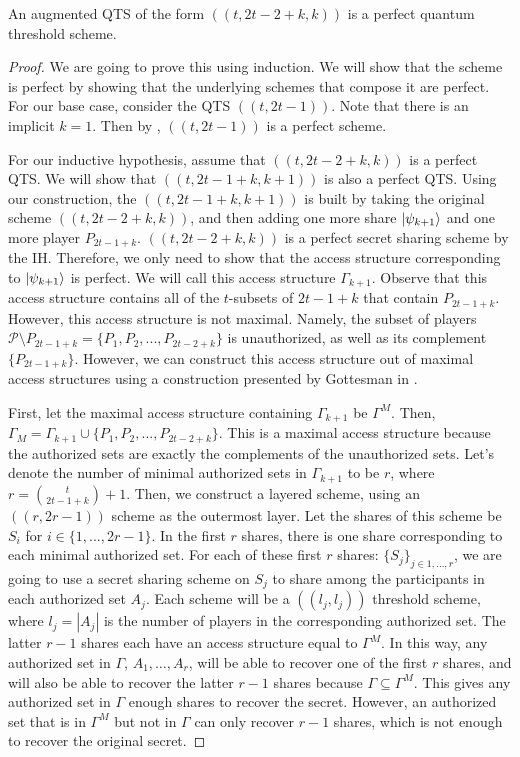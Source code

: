 \begin{theorem}
    An augmented QTS of the form $((t,2t-2+k,k))$ is a perfect quantum threshold scheme.
\end{theorem}

\begin{proof}
    We are going to prove this using induction. We will show that the scheme is perfect by showing that the underlying schemes that compose it are perfect. For our base case, consider the QTS $((t,2t-1))$. Note that there is an implicit $k=1$. Then by , $((t,2t-1))$ is a perfect scheme.
    
    For our inductive hypothesis, assume that $((t,2t-2+k,k))$ is a perfect QTS. We will show that $((t,2t-1+k,k+1))$ is also a perfect QTS. Using our construction, the $((t,2t-1+k,k+1))$ is built by taking the original scheme $((t,2t-2+k,k))$, and then adding one more share $\ket{\psi_{k+1}}$ and one more player $P_{2t-1+k}$. $((t,2t-2+k,k))$ is a perfect secret sharing scheme by the IH. Therefore, we only need to show that the access structure corresponding to $\ket{\psi_{k+1}}$ is perfect. We will call this access structure $\Gamma_{k+1}$. Observe that this access structure contains all of the $t$-subsets of $2t-1+k$ that contain $P_{2t-1+k}$. However, this access structure is not maximal. Namely, the subset of players $\mathcal{P} \setminus P_{2t-1+k} = \{P_1,P_2,...,P_{2t-2+k}\}$ is unauthorized, as well as its complement $\{P_{2t-1+k}\}$. However, we can construct this access structure out of maximal access structures using a construction presented by Gottesman in \cite{gottesman_theory_2000}.
    
    First, let the maximal access structure containing $\Gamma_{k+1}$ be $\Gamma^M$. Then, $\Gamma_M = \Gamma_{k+1} \cup \{P_1,P_2,...,P_{2t-2+k}\}$. This is a maximal access structure because the authorized sets are exactly the complements of the unauthorized sets. Let's denote the number of minimal authorized sets in $\Gamma_{k+1}$ to be $r$, where $r = \binom{t}{2t-1+k} + 1$. Then, we construct a layered scheme, using an $((r,2r-1))$ scheme as the outermost layer. Let the shares of this scheme be $S_i$ for $i \in \{1,...,2r-1\}$. In the first $r$ shares, there is one share corresponding to each minimal authorized set. For each of these first $r$ shares: $\{S_j\}_{j\in 1,...,r}$, we are going to use a secret sharing scheme on $S_j$ to share among the participants in each authorized set $A_j$. Each scheme will be a $((l_j,l_j))$ threshold scheme, where $l_j = |A_j|$ is the number of players in the corresponding authorized set. The latter $r-1$ shares each have an access structure equal to $\Gamma^M$. In this way, any authorized set in $\Gamma$, $A_1,\dots,A_r$, will be able to recover one of the first $r$ shares, and will also be able to recover the latter $r-1$ shares because $\Gamma \subseteq \Gamma^M$. This gives any authorized set in $\Gamma$ enough shares to recover the secret. However, an authorized set that is in $\Gamma^M$ but not in $\Gamma$ can only recover $r-1$ shares, which is not enough to recover the original secret.
    

\end{proof}
